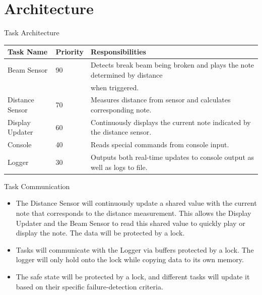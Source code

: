 \documentclass[
11pt,notheorems,hyperref={pdfauthor=whatever}
]{beamer}
\begin{document}
\section{Architecture}
\begin{frame}

\begin{block}{Task Architecture}
\begin{table}
\small
\begin{tabular}{@{} lll @{}}
\toprule
\textbf{Task Name} & \textbf{Priority} & \textbf{Responsibilities}\\
\midrule
Beam Sensor & 90 & Detects break beam being broken and
    plays the note determined by distance \\
    &&when triggered.\\
Distance Sensor & 70 & Measures distance from sensor and
    calculates corresponding note.\\
Display Updater & 60 & Continuously displays the current note
    indicated by the distance sensor.\\
Console & 40 & Reads special commands from console input.\\
Logger & 30 & Outputs both real-time updates to console output
    as well as logs to file.\\
\bottomrule
\end{tabular}
\end{table}
\end{block}

\begin{block}{Task Communication}
\begin{itemize}
    \item The Distance Sensor will continuously update
        a shared value with the current note that
        corresponds to the distance measurement. This
        allows the Display Updater and the Beam Sensor
        to read this shared value to quickly
        play or display the note. The data will be
        protected by a lock.
    \item Tasks will communicate with the Logger via
        buffers protected by a lock. The logger will
        only hold onto the lock while copying data to
        its own memory.
    \item The safe state will be protected by
        a lock, and different tasks will update it based
        on their specific failure-detection criteria.
\end{itemize}
\end{block}

\end{frame}
\end{document}
